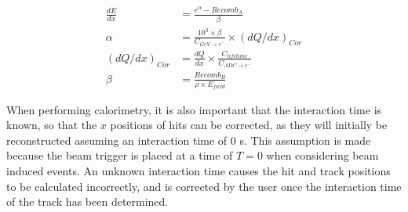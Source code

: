 \begin{subequations}
  \label{eq:ModBox}
  \begin{align}
    \frac{dE}{dx} &= \frac{ e^{\alpha} - Recomb_{A} }{ \beta } \label{eq:ModBox_1} \\
    \alpha &= \frac{10^3 \times \beta }{ C_{GeV \rightarrow e^{-} } } \times (dQ/dx)_{Cor} \label{eq:ModBox_A}\\
    (dQ/dx)_{Cor} &= \frac{dQ}{dx} \times \frac{ C_{lifetime} }{ C_{ADC \rightarrow e^{-}} } \label{eq:ModBox_Correc} \\
    \beta &= \frac{ Recomb_{B} }{ \rho \times E_{field} } \label{eq:ModBox_B}
  \end{align}
\end{subequations}

When performing calorimetry, it is also important that the interaction time is known, so that the $x$ positions of hits can be corrected, as they will initially be reconstructed assuming an interaction time of 0 s. This assumption is made because the beam trigger is placed at a time of $T = 0$ when considering beam induced events. An unknown interaction time causes the hit and track positions to be calculated incorrectly, and is corrected by the user once the interaction time of the track has been determined. 
